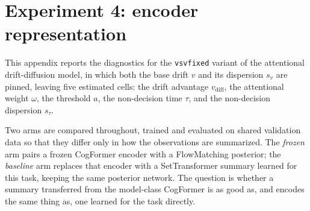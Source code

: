 %
%
%
%

\renewcommand{\topfraction}{0.92}
\renewcommand{\bottomfraction}{0.7}
\renewcommand{\textfraction}{0.06}
\renewcommand{\floatpagefraction}{0.6}

\section{Experiment 4: encoder representation}
\label{app:experiment-4-figures}

This appendix reports the diagnostics for the \texttt{vsvfixed} variant of the
attentional drift-diffusion model, in which both the base drift $v$ and its
dispersion $s_v$ are pinned, leaving five estimated cells: the drift advantage
$v_{\mathrm{diff}}$, the attentional weight $\omega$, the threshold $a$, the
non-decision time $\tau$, and the non-decision dispersion $s_\tau$.

Two arms are compared throughout, trained and evaluated on shared validation
data so that they differ only in how the observations are summarized. The
\emph{frozen} arm pairs a frozen CogFormer encoder with a FlowMatching
posterior; the \emph{baseline} arm replaces that encoder with a SetTransformer
summary learned for this task, keeping the same posterior network. The question
is whether a summary transferred from the model-class CogFormer is as good as,
and encodes the same thing as, one learned for the task directly.

